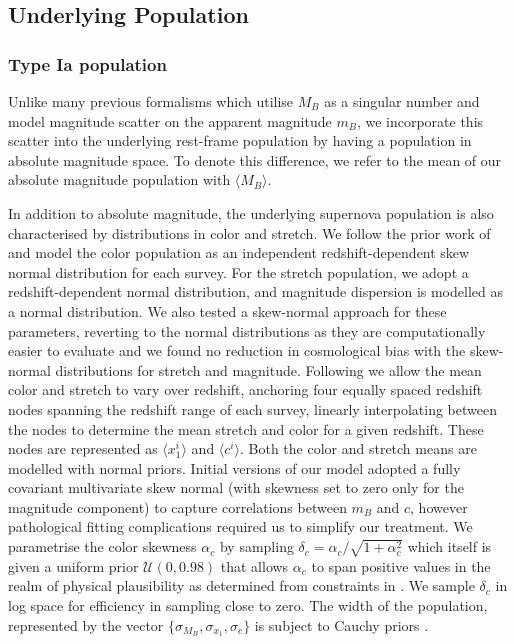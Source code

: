 \documentclass[twocolumn,trackchanges,tighten]{aastex62}
\newcommand{\rubin}{\citetalias{Rubin2015}}
\begin{document}
\subsection{Underlying Population}

\subsubsection{Type Ia population} 
\label{sec:underlying}

Unlike many previous formalisms which utilise $M_B$ as a singular number and model magnitude scatter on the apparent magnitude $m_B$, we incorporate this scatter into the underlying rest-frame population by having a population in absolute magnitude space.  To denote this difference, we refer to the mean of our absolute magnitude population with $\langle M_B \rangle$.

In addition to absolute magnitude, the underlying supernova population is also characterised by distributions in color and stretch. We follow the prior work of {\rubin} and model the color population as an independent redshift-dependent skew normal distribution for each survey. For the stretch population, we adopt a redshift-dependent normal distribution, and magnitude dispersion is modelled as a normal distribution. We also tested a skew-normal approach for these parameters, reverting to the normal distributions as they are computationally easier to evaluate and we found no reduction in cosmological bias with the skew-normal distributions for stretch and magnitude. Following {\rubin} we allow the mean color and stretch to vary over redshift, anchoring four equally spaced redshift nodes spanning the redshift range of each survey, linearly interpolating between the nodes to determine the mean stretch and color for a given redshift. These nodes are represented as $\langle x_1^i \rangle$ and $\langle c^i \rangle$. Both the color and stretch means are modelled with normal priors. Initial versions of our model adopted a fully covariant multivariate skew normal (with skewness set to zero only for the magnitude component) to capture correlations between $m_B$ and $c$, however pathological fitting complications required us to simplify our treatment. We parametrise the color skewness $\alpha_c$ by sampling $\delta_c = \alpha_c / \sqrt{1 + \alpha_c^2}$ which itself is given a uniform prior $\mathcal{U}(0,0.98)$ that allows $\alpha_c$ to span positive values in the realm of physical plausibility as determined from constraints in \citet{Scolnic2016}. We sample $\delta_c$ in log space for efficiency in sampling close to zero. The width of the population, represented by the vector $\lbrace \sigma_{M_B}, \sigma_{x_1}, \sigma_c \rbrace$ is subject to Cauchy priors .
\end{document}
